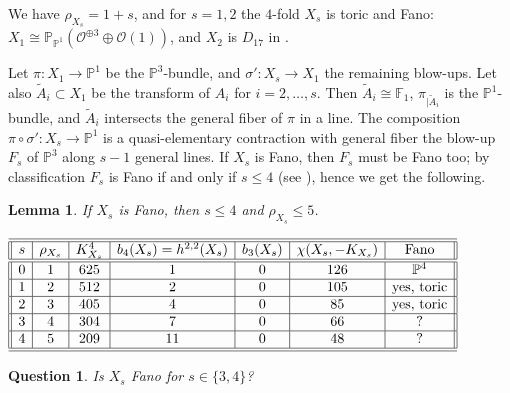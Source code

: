 \documentclass[a4paper,12pt]{amsart}
\newtheorem{lemma}[thm]{Lemma}
\newtheorem{question}[thm]{Question}
\theoremstyle{definition}
\numberwithin{figure}{section}
\numberwithin{table}{section}
\newcommand{\w}{\widetilde}
\newcommand{\ol}{\mathcal{O}}
\newcommand{\pr}{\mathbb{P}}
\begin{document}
We have $\rho_{X_s}=1+s$, and for $s=1,2$ the $4$-fold $X_s$ is toric and Fano:  $X_1\cong\pr_{\pr^1}(\ol^{\oplus 3}\oplus\ol(1))$, and $X_2$  is $D_{17}$ in \cite{bat2}.

Let $\pi\colon X_1\to\pr^1$ be the  $\pr^3$-bundle, and $\sigma'\colon X_s\to X_1$ the remaining blow-ups. Let also $\w{A}_i\subset X_1$ be the transform of $A_i$ for $i=2,\dotsc,s$. Then $\w{A}_i\cong\mathbb{F}_1$, $\pi_{|\w{A}_i}$ is the $\pr^1$-bundle, and $\w{A}_i$ intersects the general fiber of $\pi$ in a line. The composition $\pi\circ\sigma'\colon X_s\to\pr^1$ is a quasi-elementary contraction with general fiber the blow-up $F_s$ of $\pr^3$ along $s-1$ general lines.
If $X_s$ is Fano, then $F_s$ must be Fano too;
by classification $F_s$ is Fano if and only if $s\leq 4$ (see \cite[Ch.~12]{fanoEMS}), hence we get the following.
\begin{lemma}
If $X_s$ is Fano, then $s\leq 4$ and $\rho_{X_s}\leq 5$.
\end{lemma}  
{\small
\begin{table}[h]
 $\begin{array}{||c|c|c|c|c|c|c||}
   \hline\hline
   
s   & \rho_{X_s} & K_{X_s}^4 & b_4(X_s)=h^{2,2}(X_s) & b_3(X_s)& \chi(X_s,-K_{X_s}) & \text{Fano}\\
      \hline\hline

         0 & 1 & 625 & 1 & 0 & 126 & \pr^4 \\

        \hline

       1 & 2 & 512 & 2  & 0 & 105 & \text{yes, toric}\\

       \hline

     2 & 3 & 405 & 4 & 0 & 85  & \text{yes, toric}\\
       
  \hline

      3 & 4 & 304 & 7  & 0 & 66 & ?\\

        \hline

      4  & 5 & 209 & 11  & 0 & 48 & ?\\
      
\hline\hline
  \end{array}$

\bigskip
  
  \caption{Invariants of the blow-ups of $\pr^4$ along $s$ planes }\label{t1}
\end{table}}
\begin{question}\label{questionP4}
  Is $X_s$ Fano for  $s\in\{3,4\}$? 
\end{question}
\end{document}
